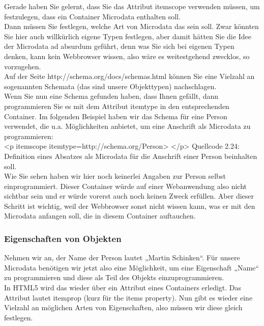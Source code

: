 Gerade haben Sie gelernt, dass Sie das Attribut itemscope verwenden müssen, um festzulegen, dass ein Container Microdata enthalten soll.\\

Dann müssen Sie festlegen, welche Art von Microdata das sein soll. Zwar könnten Sie hier auch willkürlich eigene Typen festlegen, aber damit hätten Sie die Idee der Microdata ad absurdum geführt, denn was Sie sich bei eigenen Typen denken, kann kein Webbrowser wissen, also wäre es weitestgehend zwecklos, so vorzugehen.\\

Auf der Seite
http://schema.org/docs/schemas.html 
können Sie eine Vielzahl an sogenannten Schemata (das sind unsere Objekttypen) nachschlagen.\\

Wenn Sie nun eine Schema gefunden haben, dass Ihnen gefällt, dann programmieren Sie es mit dem Attribut itemtype in den entsprechenden Container. Im folgenden Beispiel haben wir das Schema für eine Person verwendet, die u.a. Möglichkeiten anbietet, um eine Anschrift als Microdata zu programmieren:\\

<p itemscope itemtype=http://schema.org/Person>
</p>
Quellcode 2.24: Definition eines Absatzes als Microdata für die Anschrift einer Person beinhalten soll.\\

Wie Sie sehen haben wir hier noch keinerlei Angaben zur Person selbst einprogrammiert. Dieser Container würde auf einer Webanwendung also nicht sichtbar sein und er würde vorerst auch noch keinen Zweck erfüllen. Aber dieser Schritt ist wichtig, weil der Webbrowser sonst nicht wissen kann, was er mit den Microdata anfangen soll, die in diesem Container auftauchen.

\subsubsection{Eigenschaften von Objekten}

Nehmen wir an, der Name der Person lautet „Martin Schinken“. Für unsere Microdata benötigen wir jetzt also eine Möglichkeit, um eine Eigenschaft „Name“ zu programmieren und diese als Teil des Objekts einzuprogrammieren.\\

In HTML5 wird das wieder über ein Attribut eines Containers erledigt. Das Attribut lautet itemprop (kurz für the items property). Nun gibt es wieder eine Vielzahl an möglichen Arten von Eigenschaften, also müssen wir diese gleich festlegen.\\

